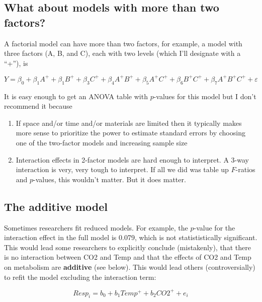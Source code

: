 \documentclass[]{book}
\providecommand{\tightlist}{%
  \setlength{\itemsep}{0pt}\setlength{\parskip}{0pt}}
\begin{document}
\subsection{What about models with more than two
factors?}\label{what-about-models-with-more-than-two-factors}

A factorial model can have more than two factors, for example, a model
with three factors (A, B, and C), each with two levels (which I'll
designate with a ``+''), is

\begin{equation}
Y = \beta_0 + \beta_1 A^+ + \beta_1 B^+ + \beta_3 C^+ + \beta_4 A^+ B^+ + \beta_5 A^+ C^+ + \beta_6 B^+ C^+ + \beta_7 A^+ B^+ C^+ + \varepsilon
\end{equation}

It is easy enough to get an ANOVA table with \(p\)-values for this model
but I don't recommend it because

\begin{enumerate}
\def\labelenumi{\arabic{enumi}.}
\tightlist
\item
  If space and/or time and/or materials are limited then it typically
  makes more sense to prioritize the power to estimate standard errors
  by choosing one of the two-factor models and increasing sample size
\item
  Interaction effects in 2-factor models are hard enough to interpret. A
  3-way interaction is very, very tough to interpret. If all we did was
  table up \(F\)-ratios and \(p\)-values, this wouldn't matter. But it
  does matter.
\end{enumerate}

\subsection{The additive model}\label{the-additive-model}

Sometimes researchers fit reduced models. For example, the \(p\)-value
for the interaction effect in the full model is 0.079, which is not
statististically significant. This would lead some researchers to
explicitly conclude (mistakenly), that there is no interaction between
CO2 and Temp and that the effects of CO2 and Temp on metabolism are
\textbf{additive} (see below). This would lead others (controversially)
to refit the model excluding the interaction term:

\begin{equation}
Resp_i = b_0 + b_1Temp^+ + b_2CO2^+ + e_i
\end{equation}
\end{document}
